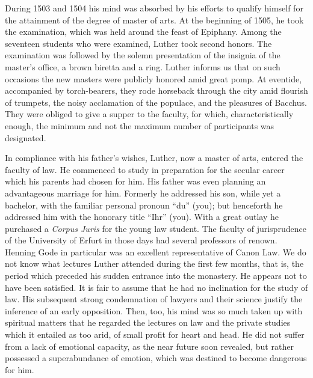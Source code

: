 During 1503 and 1504 his mind was absorbed by his efforts to
qualify himself for the attainment of the degree of master of arts.
At the beginning of 1505, he took the examination, which was
held around the feast of Epiphany. Among the seventeen students
who were examined, Luther took second honors. The examination
was followed by the solemn presentation of the insignia of the
master’s office, a brown biretta and a ring. Luther informs us that
on such occasions the new masters were publicly honored amid great
pomp. At eventide, accompanied by torch-bearers, they rode horseback through the city amid flourish of trumpets, the noisy acclamation of the populace, and the pleasures of Bacchus. They were
obliged to give a supper to the faculty, for which, characteristically
enough, the minimum and not the maximum number of participants
was designated.

In compliance with his father’s wishes, Luther, now a master of
arts, entered the faculty of law. He commenced to study in preparation
for the secular career which his parents had chosen for him.
His father was even planning an advantageous marriage for him.
Formerly he addressed his son, while yet a bachelor, with the familiar
personal pronoun ``du'' (you); but henceforth he addressed him with
the honorary title ``Ihr'' (you). With a great outlay he purchased
a \textit{Corpus Juris} for the young law student.
The faculty of jurisprudence of the University of Erfurt in
those days had several professors of renown. Henning Gode in
particular was an excellent representative of Canon Law. We do
not know what lectures Luther attended during the first few
months, that is, the period which preceded his sudden entrance into
the monastery. He appears not to have been satisfied. It is fair to
assume that he had no inclination for the study of law. His subsequent
strong condemnation of lawyers and their science justify the
inference of an early opposition. Then, too, his mind was so much
taken up with spiritual matters that he regarded the lectures on
law and the private studies which it entailed as too arid, of small
profit for heart and head. He did not suffer from a lack of emotional
capacity, as the near future soon revealed, but rather possessed a
superabundance of emotion, which was destined to become dangerous
for him.

